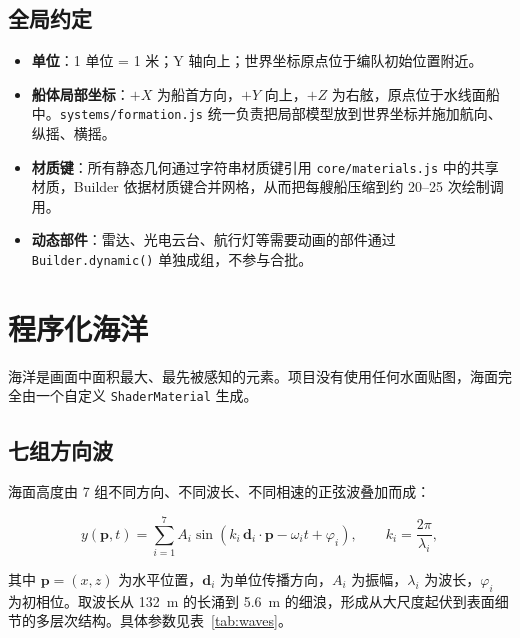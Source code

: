 \documentclass[UTF8, a4paper, 11pt]{ctexart}
\newcommand{\file}[1]{\texttt{#1}}
\begin{document}
\subsection{全局约定}

\begin{itemize}
  \item \textbf{单位}：1 单位 = 1 米；Y 轴向上；世界坐标原点位于编队初始位置附近。
  \item \textbf{船体局部坐标}：$+X$ 为船首方向，$+Y$ 向上，$+Z$ 为右舷，原点位于水线面船中。\file{systems/formation.js} 统一负责把局部模型放到世界坐标并施加航向、纵摇、横摇。
  \item \textbf{材质键}：所有静态几何通过字符串材质键引用 \file{core/materials.js} 中的共享材质，Builder 依据材质键合并网格，从而把每艘船压缩到约 20--25 次绘制调用。
  \item \textbf{动态部件}：雷达、光电云台、航行灯等需要动画的部件通过 \file{Builder.dynamic()} 单独成组，不参与合批。
\end{itemize}

\section{程序化海洋}

海洋是画面中面积最大、最先被感知的元素。项目没有使用任何水面贴图，海面完全由一个自定义 \texttt{ShaderMaterial} 生成。

\subsection{七组方向波}

海面高度由 7 组不同方向、不同波长、不同相速的正弦波叠加而成：

\begin{equation}
y(\mathbf{p}, t)=\sum_{i=1}^{7} A_i \sin\!\left(k_i\,\mathbf{d}_i\cdot\mathbf{p}-\omega_i t+\varphi_i\right),
\qquad k_i=\frac{2\pi}{\lambda_i},
\label{eq:waves}
\end{equation}

其中 $\mathbf{p}=(x,z)$ 为水平位置，$\mathbf{d}_i$ 为单位传播方向，$A_i$ 为振幅，$\lambda_i$ 为波长，$\varphi_i$ 为初相位。取波长从 132~m 的长涌到 5.6~m 的细浪，形成从大尺度起伏到表面细节的多层次结构。具体参数见表~\ref{tab:waves}。
\end{document}
